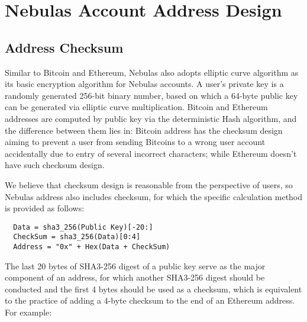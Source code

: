 \section{Nebulas Account Address Design}

\subsection{Address Checksum}

Similar to Bitcoin and Ethereum, Nebulas also adopts elliptic curve algorithm as its basic encryption algorithm for Nebulas accounts. A user’s private key is a randomly generated 256-bit binary number, based on which a 64-byte public key can be generated via elliptic curve multiplication. Bitcoin and Ethereum addresses are computed by public key via the deterministic Hash algorithm, and the difference between them lies in: Bitcoin address has the checksum design aiming to prevent a user from sending Bitcoins to a wrong user account accidentally due to entry of several incorrect characters; while Ethereum doesn’t have such checksum design.


We believe that checksum design is reasonable from the perspective of users, so Nebulas address also includes checksum, for which the specific calculation method is provided as follows:


\begin{verbatim}
  Data = sha3_256(Public Key)[-20:]
  CheckSum = sha3_256(Data)[0:4]
  Address = "0x" + Hex(Data + CheckSum)
\end{verbatim}


The last 20 bytes of SHA3-256 digest of a public key serve as the major component of an address, for which another SHA3-256 digest should be conducted and the first 4 bytes should be used as a checksum, which is equivalent to the practice of adding a 4-byte checksum to the end of an Ethereum address. For example:


